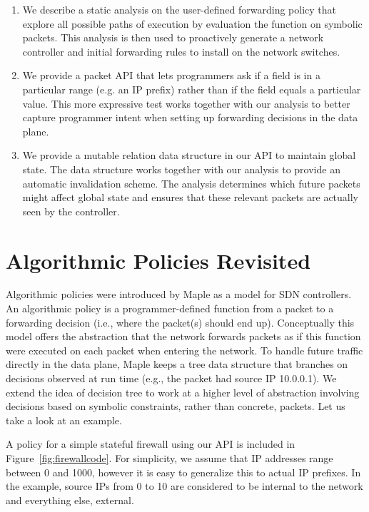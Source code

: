 \documentclass[nocopyrightspace]{sigplanconf}
\begin{document}
\begin{enumerate}
\item We describe a static analysis on the user-defined forwarding policy that explore all possible paths of execution by evaluation the function on symbolic packets. This analysis is then used to proactively generate a network controller and initial forwarding rules to install on the network switches.
\item We provide a packet API that lets programmers ask if a field is in a particular range (e.g. an IP prefix) rather than if the field equals a particular value. This more expressive test works together with our analysis to better capture programmer intent when setting up forwarding decisions in the data plane.
\item We provide a mutable relation data structure in our API to maintain global state. The data structure works together with our analysis to provide an automatic invalidation scheme. The analysis determines which future packets might affect global state and ensures that these relevant packets are actually seen by the controller.
\end{enumerate}



\section*{Algorithmic Policies Revisited}
Algorithmic policies were introduced by Maple as a model for SDN controllers. An algorithmic policy is a programmer-defined function from a packet to a forwarding decision (i.e., where the packet(s) should end up). Conceptually this model offers the abstraction that the network forwards packets as if this function were executed on each packet when entering the network. To handle future traffic directly in the data plane, Maple keeps a tree data structure that branches on decisions observed at run time (e.g., the packet had source IP 10.0.0.1). We extend the idea of decision tree to work at a higher level of abstraction involving decisions based on symbolic constraints, rather than concrete, packets. Let us take a look at an example.


A policy for a simple stateful firewall using our API is included in Figure~\ref{fig:firewallcode}. For simplicity, we assume that IP addresses range between 0 and 1000, however it is easy to generalize this to actual IP prefixes.
In the example, source IPs from 0 to 10 are considered to be internal to the network and everything else, external. 
\end{document}
